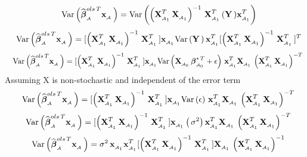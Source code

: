 \documentclass[11pt]{report}
\newcommand{\bfmath}[1]{\mbox{\boldmath$#1$\unboldmath}}
\begin{document}
\begin{enumerate}
$$ \quad \text{Var}\left( \widehat{\bfmath{\beta}}^{ols\,T}_{_\mathcal{A}}\mathbf{x}_{_\mathcal{A}}\,\right) = \text{Var}\left(\left( \mathbf{X}^{T}_{_{\mathcal{A}_1}}\,\mathbf{X}_{_{\mathcal{A}_1}}\right)^{-1}\,\mathbf{X}^{T}_{_{\mathcal{A}_1}}\,(\mathbf{Y}\,)\mathbf{x}^{T}_{_{\mathcal{A}_1}}\right) $$
$$ \quad \text{Var}\left( \widehat{\bfmath{\beta}}^{ols\,T}_{_\mathcal{A}}\mathbf{x}_{_\mathcal{A}}\,\right) = [\left( \mathbf{X}^{T}_{_{\mathcal{A}_1}}\,\mathbf{X}_{_{\mathcal{A}_1}}\right)^{-1}\,\mathbf{X}^{T}_{_{\mathcal{A}_1}}\,]\mathbf{x}_{_{\mathcal{A}_1}}\text{Var}\left(\mathbf{Y}\,\right)\mathbf{x}^{T}_{_{\mathcal{A}_1}}[\left( \mathbf{X}^{T}_{_{\mathcal{A}_1}}\,\mathbf{X}_{_{\mathcal{A}_1}}\right)^{-1}\,\mathbf{X}^{T}_{_{\mathcal{A}_1}}\,]^{T} $$
$$ \quad \text{Var}\left( \widehat{\bfmath{\beta}}^{ols\,T}_{_\mathcal{A}}\mathbf{x}_{_\mathcal{A}}\,\right) = [\left( \mathbf{X}^{T}_{_{\mathcal{A}_1}}\,\mathbf{X}_{_{\mathcal{A}_1}}\right)^{-1}\,\mathbf{X}^{T}_{_{\mathcal{A}_1}}\,]\mathbf{x}_{_{\mathcal{A}_1}}\text{Var}\left(\mathbf{X}_{_{\mathcal{A}_0}}\,\bfmath{\beta}^{\ast\,T}_{_{\mathcal{A}_0}}+\mathbf{\epsilon} \right)\,\mathbf{x}^{T}_{_{\mathcal{A}_1}}\mathbf{X}_{_{\mathcal{A}_1}}\,\left( \mathbf{X}^{T}_{_{\mathcal{A}_1}}\,\mathbf{X}_{_{\mathcal{A}_1}}\right)^{-T}\, $$
Assuming X is non-stochastic and independent of the error term
$$ \quad \text{Var}\left( \widehat{\bfmath{\beta}}^{ols\,T}_{_\mathcal{A}}\mathbf{x}_{_\mathcal{A}}\,\right) = [\left( \mathbf{X}^{T}_{_{\mathcal{A}_1}}\,\mathbf{X}_{_{\mathcal{A}_1}}\right)^{-1}\,\mathbf{X}^{T}_{_{\mathcal{A}_1}}\,]\mathbf{x}_{_{\mathcal{A}_1}}\text{Var}\left(\mathbf{\epsilon} \right)\,\mathbf{x}^{T}_{_{\mathcal{A}_1}}\mathbf{X}_{_{\mathcal{A}_1}}\,\left( \mathbf{X}^{T}_{_{\mathcal{A}_1}}\,\mathbf{X}_{_{\mathcal{A}_1}}\right)^{-T}\, $$
$$ \quad \text{Var}\left( \widehat{\bfmath{\beta}}^{ols\,T}_{_\mathcal{A}}\mathbf{x}_{_\mathcal{A}}\,\right) = [\left( \mathbf{X}^{T}_{_{\mathcal{A}_1}}\,\mathbf{X}_{_{\mathcal{A}_1}}\right)^{-1}\,\mathbf{X}^{T}_{_{\mathcal{A}_1}}\,]\mathbf{x}_{_{\mathcal{A}_1}}\left(\,\mathbf{\sigma}^{2}\right)\mathbf{x}^{T}_{_{\mathcal{A}_1}}\mathbf{X}_{_{\mathcal{A}_1}}\,\left( \mathbf{X}^{T}_{_{\mathcal{A}_1}}\,\mathbf{X}_{_{\mathcal{A}_1}}\right)^{-T}\, $$
$$ \quad \text{Var}\left( \widehat{\bfmath{\beta}}^{ols\,T}_{_\mathcal{A}}\mathbf{x}_{_\mathcal{A}}\,\right) = \mathbf{\sigma}^{2}\,\mathbf{x}_{_{\mathcal{A}_1}}\mathbf{x}^{T}_{_{\mathcal{A}_1}}[\left( \mathbf{X}^{T}_{_{\mathcal{A}_1}}\,\mathbf{X}_{_{\mathcal{A}_1}}\right)^{-1}\,\mathbf{X}^{T}_{_{\mathcal{A}_1}}\,]\mathbf{X}_{_{\mathcal{A}_1}}\,\left( \mathbf{X}^{T}_{_{\mathcal{A}_1}}\,\mathbf{X}_{_{\mathcal{A}_1}}\right)^{-1}\, $$

\end{enumerate}
\end{document}
